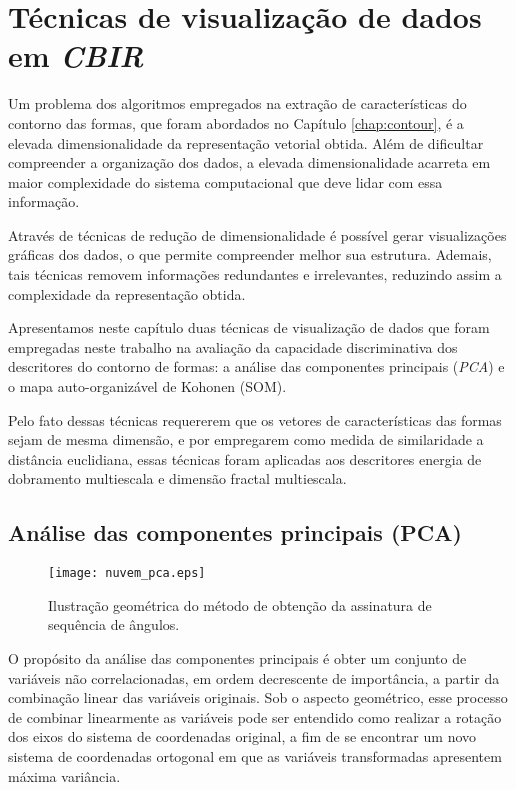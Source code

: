 
\chapter{Técnicas de visualização de dados em \emph{CBIR}}

Um problema dos algoritmos empregados na extração de características do contorno das formas, que foram abordados no Capítulo \ref{chap:contour}, é a elevada dimensionalidade da representação vetorial obtida. Além de dificultar compreender a organização dos dados, a elevada dimensionalidade acarreta em maior complexidade do sistema computacional que deve lidar com essa informação. 

Através de técnicas de redução de dimensionalidade é possível gerar visualizações gráficas dos dados, o que permite compreender melhor sua estrutura. Ademais, tais técnicas removem informações redundantes e irrelevantes, reduzindo assim a complexidade da representação obtida.

Apresentamos neste capítulo duas técnicas de visualização de dados que foram empregadas neste trabalho na avaliação da capacidade discriminativa dos descritores do contorno de formas: a análise das componentes principais (\emph{PCA}) e o mapa auto-organizável de Kohonen (SOM).

Pelo fato dessas técnicas requererem que os vetores de características das formas sejam de mesma dimensão, e por empregarem como medida de similaridade a distância euclidiana, essas técnicas foram aplicadas aos descritores energia de dobramento multiescala e dimensão fractal multiescala.


\section{Análise das componentes principais (PCA)}

\begin{figure}[h!]
  \caption{\label{fig:nuvem_pca} Ilustração geométrica do método de obtenção da assinatura de sequência de ângulos.}
  \centering
  \texttt{[image: nuvem\_pca.eps]}
\end{figure}

O propósito da análise das componentes principais é obter um conjunto de variáveis não correlacionadas, em ordem decrescente de importância, a partir da combinação linear das variáveis originais. Sob o aspecto geométrico, esse processo de combinar linearmente as variáveis pode ser entendido como realizar a rotação dos eixos do sistema de coordenadas original, a fim de se encontrar um novo sistema de coordenadas ortogonal em que as variáveis transformadas apresentem máxima variância. 


